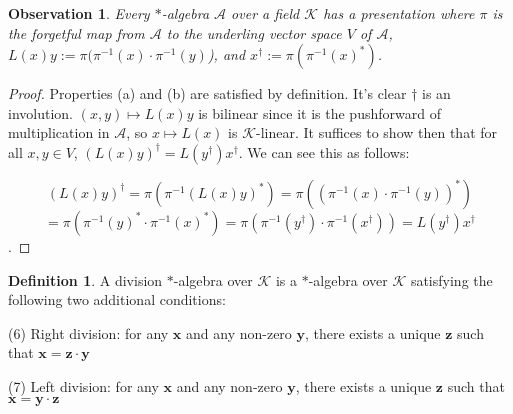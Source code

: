 \documentclass[12pt]{article}
\newtheorem{observation}[theorem]{Observation}
\theoremstyle{definition}
\newtheorem{definition}[theorem]{Definition}
\theoremstyle{remark}
\begin{document}
\begin{observation} Every \(*\)-algebra \(\mathcal{A}\) over a field \(\mathcal{K}\) has a presentation where \(\pi\) is the forgetful map from \(\mathcal{A}\) to the underling vector space \(V\) of \(\mathcal{A}\), \(L(x)y := \pi(\pi^{-1}(x) \cdot \pi^{-1}(y)\)), and \(x^{\dagger} := \pi(\pi^{-1}(x)^*)\).
\end{observation}

\begin{proof}
Properties (a) and (b) are satisfied by definition. It's clear \(\dagger\) is an involution. \((x,y) \mapsto L(x)y\) is bilinear since it is the pushforward of multiplication in \(\mathcal{A}\), so \(x \mapsto L(x)\) is \(\mathcal{K}\)-linear. It suffices to show then that for all \(x,y \in V\), $(L(x)y)^{\dagger} = L(y^{\dagger}) x^{\dagger}$. We can see this as follows:

\[(L(x)y)^{\dagger} = \pi(\pi^{-1}(L(x)y)^*) = \pi((\pi^{-1}(x) \cdot \pi^{-1}(y))^*)\] \[ = \pi(\pi^{-1}(y)^* \cdot \pi^{-1}(x)^*)= \pi(\pi^{-1}(y^{\dagger}) \cdot \pi^{-1}(x^{\dagger})) = L(y^{\dagger})x^{\dagger}\].
\end{proof}



\begin{definition}
A division $*$-algebra over $\mathcal{K}$ is a $*$-algebra over $\mathcal{K}$ satisfying the following two additional conditions:

(6) Right division: for any $\mathbf{x}$ and any non-zero $\mathbf{y}$, there exists a unique $\mathbf{z}$ such that $\mathbf{x} = \mathbf{z} \cdot \mathbf{y}$

(7) Left division: for any $\mathbf{x}$ and any non-zero $\mathbf{y}$, there exists a unique $\mathbf{z}$ such that $\mathbf{x} = \mathbf{y} \cdot \mathbf{z}$
\end{definition}
\end{document}
